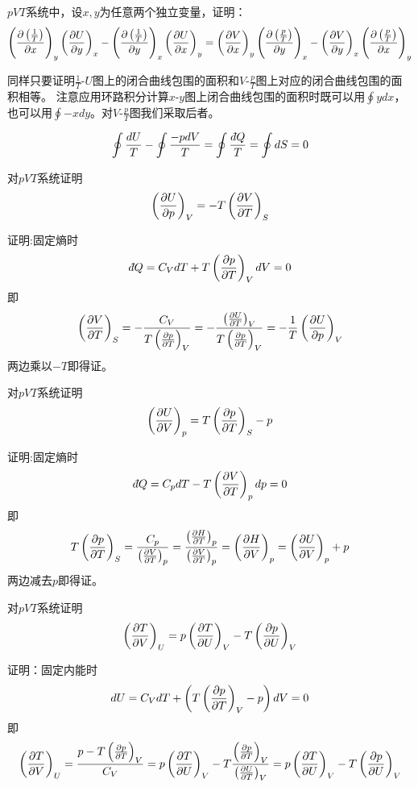 \documentclass[CJK]{beamer}
\begin{document}
\begin{frame}
  \bch
  $pVT$系统中，设$x, y$为任意两个独立变量，证明：
      {\scriptsize $$ \pfrac {\left(\frac{1}{T}\right)}xy \pfrac Uyx - \pfrac {\left(\frac{1}{T}\right)}yx \pfrac Uxy = \pfrac Vxy \pfrac {\left(\frac{p}{T}\right)}yx - \pfrac Vyx \pfrac {\left(\frac{p}{T}\right)}xy $$}  
  \ech
\end{frame}


\begin{frame}
  \bch
  同样只要证明$\frac{1}{T}$-$U$图上的闭合曲线包围的面积和$V$-$\frac{p}{T}$图上对应的闭合曲线包围的面积相等。
  注意应用环路积分计算$x$-$y$图上闭合曲线包围的面积时既可以用$\oint ydx$，也可以用$\oint -x dy$。对$V$-$\frac{p}{T}$图我们采取后者。
  
  $$\oint \frac{dU}{T} - \oint \frac{-pdV}{T} = \oint \frac{\dbar Q}{T} = \oint dS = 0$$
  
  \ech
\end{frame}

\begin{frame}
  \bch
  对$pVT$系统证明
  $$\pfrac UpV = -T\pfrac VTS$$
  \ech
\end{frame}


\begin{frame}
  \bch
  证明:固定熵时
  $$ \dbar Q = C_V dT + T \pfrac pTV dV = 0 $$
  即
  $$ \pfrac VTS = -\frac{C_V}{T\pfrac pTV} = -\frac{\pfrac UTV}{T\pfrac pTV} = -\frac{1}{T} \pfrac UpV $$
  两边乘以$-T$即得证。
  \ech
\end{frame}


\begin{frame}
  \bch
  对$pVT$系统证明
  $$\pfrac UVp = T\pfrac pTS - p$$
  \ech
\end{frame}


\begin{frame}
  \bch
  证明:固定熵时
  $$ \dbar Q = C_p dT - T\pfrac VTp dp = 0 $$
  即
  $$ T\pfrac pTS = \frac{C_p}{\pfrac VTp} = \frac{\pfrac HTp}{\pfrac VTp} =  \pfrac HVp = \pfrac UVp + p $$
  两边减去$p$即得证。
  \ech
\end{frame}

\begin{frame}
  \bch
  对$pVT$系统证明
  $$\pfrac TVU = p\pfrac TUV - T\pfrac pUV $$
  \ech
\end{frame}


\begin{frame}
  \bch
  证明：固定内能时
  $$ dU = C_V dT + \left(T\pfrac pTV - p\right)dV = 0$$
  即
  {\scriptsize
  $$ \pfrac TVU = \frac{p-T\pfrac pTV }{C_V} = p\pfrac TUV - T\frac{\pfrac pTV}{\pfrac UTV}  = p\pfrac TUV - T\pfrac pUV $$}
  \ech
\end{frame}
\end{document}
